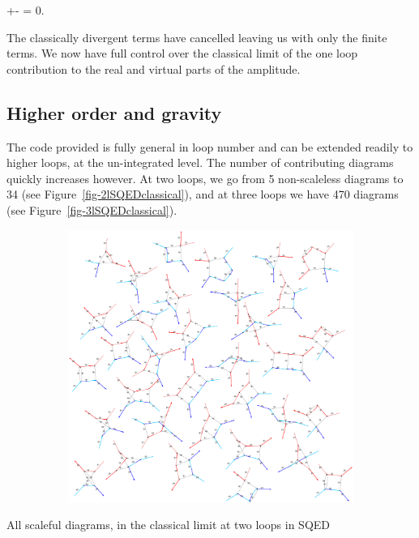 \documentclass[
  11pt,
  a4paper,
  DIV=11,
  numbers=noendperiod,
  oneside]{scrreprt}
\let\[\relax \let\]\relax %
\DeclareRobustCommand{\[}{\begin{equation}}
\DeclareRobustCommand{\]}{\end{equation}}
\begin{document}
\[
\int \dn[4]{\bar{\ell}}+-  =  0.
\]

The classically divergent terms have cancelled leaving us with only the
finite terms. We now have full control over the classical limit of the
one loop contribution to the real and virtual parts of the amplitude.

\hypertarget{higher-order-and-gravity}{%
\subsection{Higher order and gravity}\label{higher-order-and-gravity}}

The code provided is fully general in loop number and can be extended
readily to higher loops, at the un-integrated level. The number of
contributing diagrams quickly increases however. At two loops, we go
from 5 non-scaleless diagrams to 34 (see
Figure~\ref{fig-2lSQEDclassical}), and at three loops we have 470
diagrams (see Figure~\ref{fig-3lSQEDclassical}).

\hypertarget{fig-2lSQEDclassical}{}
{
\makeatletter
\def\LT@makecaption#1#2#3{%
  \noalign{\smash{\hbox{\kern\textwidth\rlap{\kern\marginparsep
  \parbox[t]{\marginparwidth}{%
    \footnotesize{%
      \vspace{(1.1\baselineskip)}
    #1{#2: }\ignorespaces #3}}}}}}%
    }
\makeatother

\begin{figure}[H]

{\centering \includegraphics[width=8in,height=3.5in]{./scattering_files/figure-latex/dot-figure-4.png}

}

\end{figure}

\label{fig-2lSQEDclassical}All scaleful diagrams, in the classical limit
at two loops in SQED

}
\end{document}
